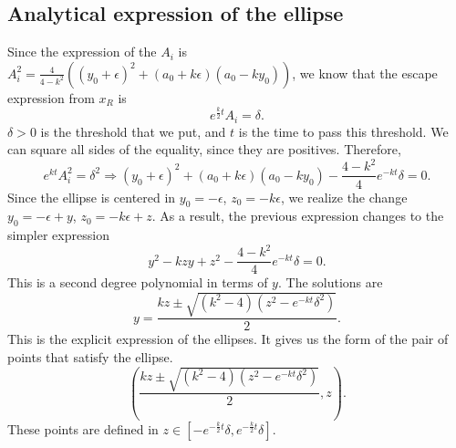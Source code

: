 \documentclass[a4paper,preprint,11pt]{article}
\begin{document}
\subsection{Analytical expression of the ellipse}
Since the expression of the $A_i$ is $A_i^2 = \frac{4}{4-k^2}((y_0+\epsilon)^2+(a_0+k\epsilon)(a_0-ky_0))$, we know that the escape expression from $x_R$ is
$$
e^{\frac{k}{2}t}A_i = \delta.
$$
$\delta>0$ is the threshold that we put, and $t$ is the time to pass this threshold. We can square all sides of the equality, since they are positives. Therefore,
$$
e^{kt}A_i^2 = \delta^2 \Longrightarrow (y_0+\epsilon)^2+(a_0+k\epsilon)(a_0-ky_0) - \frac{4-k^2}{4}e^{-kt}\delta = 0.
$$
Since the ellipse is centered in $y_0=-\epsilon$, $z_0=-k\epsilon$, we realize the change $y_0=-\epsilon+y$, $z_0=-k\epsilon+z$. As a result, the previous expression changes to the simpler expression
$$
y^2-kzy+z^2 - \frac{4-k^2}{4}e^{-kt}\delta = 0.
$$
This is a second degree polynomial in terms of $y$. The solutions are
$$
y = \frac{kz\pm\sqrt{(k^2-4)(z^2-e^{-kt}\delta^2)}}{2}.
$$
This is the explicit expression of the ellipses. It gives us the form of the pair of points that satisfy the ellipse.
$$
(\frac{kz\pm\sqrt{(k^2-4)(z^2-e^{-kt}\delta^2)}}{2},z).
$$
These points are defined in $z\in[-e^{-\frac{k}{2}t}\delta,e^{-\frac{k}{2}t}\delta]$.

\end{document}
